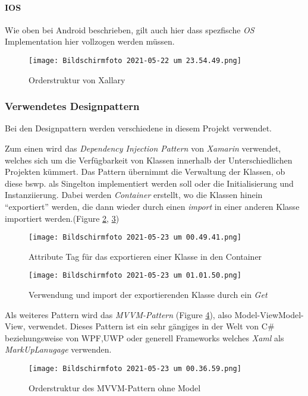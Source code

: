\paragraph{IOS} Wie oben bei Android beschrieben, gilt auch hier dass spezfische \textit{OS} Implementation hier vollzogen werden müssen.
\begin{figure}[h]
    \centering
    \texttt{[image: Bildschirmfoto 2021-05-22 um 23.54.49.png]}
    \caption{Orderstruktur von Xallary}
    \label{fig:Ordnerstruktur}
\end{figure}
\subsubsection{Verwendetes Designpattern}
Bei den Designpattern werden verschiedene in diesem Projekt verwendet. 

Zum einen wird das 
\textit{Dependency Injection Pattern} von \textit{Xamarin} verwendet, welches sich um die Verfügbarkeit von Klassen innerhalb
der Unterschiedlichen Projekten kümmert. Das Pattern übernimmt die Verwaltung der Klassen, ob diese bswp. als Singelton implementiert werden soll oder
die Initialisierung und Instanziierung. Dabei werden \textit{Container} erstellt, wo die Klassen
hinein ``exportiert''  werden, die dann wieder durch einen \textit{import} in einer anderen Klasse
importiert werden.(Figure \ref{fig:IoC}, \ref{fig:IoCImport}) 
\begin{figure}[h]
    \centering
    \texttt{[image: Bildschirmfoto 2021-05-23 um 00.49.41.png]}
    \caption{Attribute Tag für das exportieren einer Klasse in den Container}
    \label{fig:IoC}
\end{figure}

\begin{figure}[h]
    \centering
    \texttt{[image: Bildschirmfoto 2021-05-23 um 01.01.50.png]}
    \caption{Verwendung und import der exportierenden Klasse durch ein \textit{Get} }
    \label{fig:IoCImport}
\end{figure}


Als weiteres Pattern wird das \textit{MVVM-Pattern} (Figure \ref{fig:MVVMPattern}), also Model-ViewModel-View, verwendet.
Dieses Pattern ist ein sehr gängiges in der Welt von C\# beziehungsweise von WPF,UWP oder generell Frameworks welches \textit{Xaml} als 
\textit{MarkUpLanugage} verwenden.
\begin{figure}[h]
    \centering
    \texttt{[image: Bildschirmfoto 2021-05-23 um 00.36.59.png]}
    \caption{Orderstruktur des MVVM-Pattern ohne Model}
    \label{fig:MVVMPattern}
\end{figure}

